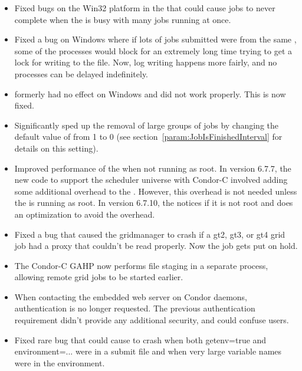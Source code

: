 \begin{itemize}

\item Fixed bugs on the Win32 platform in the  that could
cause jobs to never complete when the  is busy with many jobs
running at once.

\item Fixed a bug on Windows where if lots of jobs submitted were from
  the same , some of the  processes
  would block for an extremely long time trying to get a lock for
  writing to the  file.
  Now, log writing happens more fairly, and no 
  processes can be delayed indefinitely.

\item {}  formerly had no effect on Windows and
did not work properly. This is now fixed.

\item Significantly sped up the removal of large groups of jobs by
changing the default value of  from 1
to 0 (see section~\ref{param:JobIsFinishedInterval} for details on this
setting).

\item Improved performance of the  when not running as
  root.
  In version 6.7.7, the new code to support the scheduler universe
  with Condor-C involved adding some additional overhead to the
  .
  However, this overhead is not needed unless the  is
  running as root.
  In version 6.7.10, the  notices if it is not root and
  does an optimization to avoid the overhead.

\item Fixed a bug that caused the gridmanager to crash if a gt2, gt3, or
gt4 grid job had a proxy that couldn't be read properly. Now the job gets
put on hold.

\item The Condor-C GAHP now performs file staging in a 
separate process, allowing remote grid jobs to be started earlier.

\item When contacting the embedded web server on Condor daemons,
  authentication is no longer requested.
  The previous authentication requirement didn't provide any
  additional security, and could confuse users.

\item Fixed rare bug that could cause  to crash when
  both getenv=true and environment=... were in a submit file and when
  very large variable names were in the environment. 


\end{itemize}
